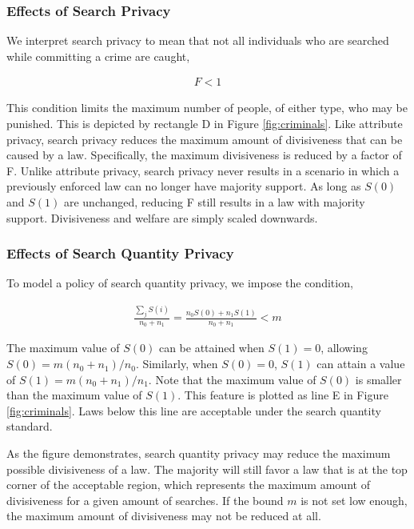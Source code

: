 \subsubsection{Effects of Search Privacy}

We interpret search privacy to mean that not all individuals who are searched while committing a crime are caught, 

\begin{align}
F<1
\end{align}

This condition limits the maximum number of people, of either type, who may be punished.  This is depicted by rectangle D in Figure \ref{fig:criminals}.  Like attribute privacy, search privacy reduces the maximum amount of divisiveness that can be caused by a law.  Specifically, the maximum divisiveness is reduced by a factor of F.  Unlike attribute privacy, search privacy never results in a scenario in which a previously enforced law can no longer have majority support.  As long as $S(0)$ and $S(1)$ are unchanged, reducing F still results in a law with majority support.  Divisiveness and welfare are simply scaled downwards.

\subsubsection{Effects of Search Quantity Privacy}

To model a policy of search quantity privacy, we impose the condition, 

\begin{align}
\frac{\sum_j S(i)}{n_0 + n_1} = \frac{n_0 S(0) + n_1 S(1)}{n_0 + n_1}  < m
\end{align}

The maximum value of $S(0)$ can be attained when $S(1) = 0$, allowing $S(0) = m (n_0 + n_1)/n_0$.  Similarly, when $S(0) = 0$, $S(1)$ can attain a value of $S(1) = m (n_0 + n_1)/n_1$.   Note that the maximum value of $S(0)$ is smaller than the maximum value of $S(1)$.  This feature is plotted as line E in Figure \ref{fig:criminals}.  Laws below this line are acceptable under the search quantity standard.  

As the figure demonstrates, search quantity privacy may reduce the maximum possible divisiveness of a law.  The majority will still favor a law that is at the top corner of the acceptable region, which represents the maximum amount of divisiveness for a given amount of searches.  If the bound $m$ is not set low enough, the maximum amount of divisiveness may not be reduced at all.

